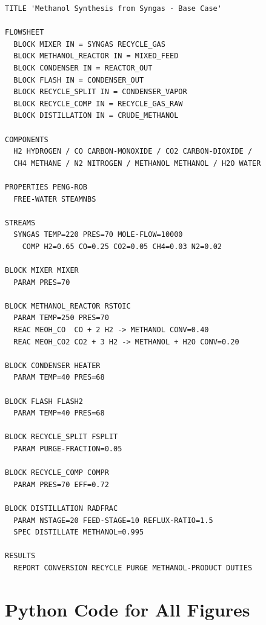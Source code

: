 \documentclass[12pt,twoside,openany]{book}
\begin{document}
\begin{lstlisting}[language={}, caption={Methanol\_Synthesis\_BaseCase.apw (complete)}]
TITLE 'Methanol Synthesis from Syngas - Base Case'

FLOWSHEET
  BLOCK MIXER IN = SYNGAS RECYCLE_GAS
  BLOCK METHANOL_REACTOR IN = MIXED_FEED
  BLOCK CONDENSER IN = REACTOR_OUT
  BLOCK FLASH IN = CONDENSER_OUT
  BLOCK RECYCLE_SPLIT IN = CONDENSER_VAPOR
  BLOCK RECYCLE_COMP IN = RECYCLE_GAS_RAW
  BLOCK DISTILLATION IN = CRUDE_METHANOL

COMPONENTS
  H2 HYDROGEN / CO CARBON-MONOXIDE / CO2 CARBON-DIOXIDE /
  CH4 METHANE / N2 NITROGEN / METHANOL METHANOL / H2O WATER

PROPERTIES PENG-ROB
  FREE-WATER STEAMNBS

STREAMS
  SYNGAS TEMP=220 PRES=70 MOLE-FLOW=10000
    COMP H2=0.65 CO=0.25 CO2=0.05 CH4=0.03 N2=0.02

BLOCK MIXER MIXER
  PARAM PRES=70

BLOCK METHANOL_REACTOR RSTOIC
  PARAM TEMP=250 PRES=70
  REAC MEOH_CO  CO + 2 H2 -> METHANOL CONV=0.40
  REAC MEOH_CO2 CO2 + 3 H2 -> METHANOL + H2O CONV=0.20

BLOCK CONDENSER HEATER
  PARAM TEMP=40 PRES=68

BLOCK FLASH FLASH2
  PARAM TEMP=40 PRES=68

BLOCK RECYCLE_SPLIT FSPLIT
  PARAM PURGE-FRACTION=0.05

BLOCK RECYCLE_COMP COMPR
  PARAM PRES=70 EFF=0.72

BLOCK DISTILLATION RADFRAC
  PARAM NSTAGE=20 FEED-STAGE=10 REFLUX-RATIO=1.5
  SPEC DISTILLATE METHANOL=0.995

RESULTS
  REPORT CONVERSION RECYCLE PURGE METHANOL-PRODUCT DUTIES
\end{lstlisting}


\chapter{Python Code for All Figures}
\end{document}
